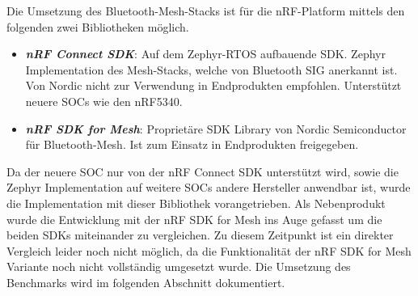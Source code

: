 Die Umsetzung des Bluetooth-Mesh-Stacks ist für die nRF-Platform mittels den folgenden zwei Bibliotheken möglich. 

\begin{itemize}
	\item \textit{\textbf{nRF Connect SDK}}: Auf dem Zephyr-RTOS aufbauende SDK. Zephyr Implementation des Mesh-Stacks, welche von Bluetooth SIG anerkannt ist. Von Nordic nicht zur Verwendung in Endprodukten empfohlen. Unterstützt neuere SOCs wie den nRF5340.  \cite{nordic_semi_welcome_to_the_nrf_connect_sdk_2020}
	\item \textit{\textbf{nRF SDK for Mesh}}: Proprietäre SDK Library von Nordic Semiconductor für Bluetooth-Mesh. Ist zum Einsatz in Endprodukten freigegeben. \cite{nordic_semi_nrf_sdk_for_mesh_2020}
\end{itemize}

Da der neuere SOC nur von der nRF Connect SDK unterstützt wird, sowie die Zephyr Implementation auf weitere SOCs andere Hersteller anwendbar ist, wurde die Implementation mit dieser Bibliothek vorangetrieben. Als Nebenprodukt wurde die Entwicklung mit der nRF SDK for Mesh ins Auge gefasst um die beiden SDKs miteinander zu vergleichen. Zu diesem Zeitpunkt ist ein direkter Vergleich leider noch nicht möglich, da die Funktionalität der nRF SDK for Mesh Variante noch nicht vollständig umgesetzt wurde. Die Umsetzung des Benchmarks wird im folgenden Abschnitt dokumentiert.





